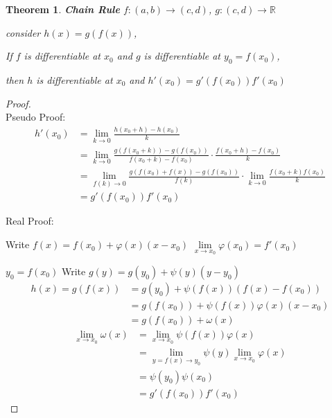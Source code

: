 \documentclass[12pt]{article}
\theoremstyle{plain}
\newtheorem{theorem}{Theorem}[subsection]
\renewcommand{\phi}{\varphi}
\newcommand{\dlim}{\displaystyle\lim\limits}
\begin{document}
    \begin{theorem}{\textbf{Chain Rule}}
        $f:(a,b) \to (c,d)$, $g:(c, d) \to \mathbb{R}$

        consider $h(x) = g(f(x))$,

        If $f$ is differentiable at $x_0$ and $g$ is differentiable
        at $y_0 =f (x_0)$,

        then $h$ is differentiable at $x_0$ and $h'(x_0)= g'(f(x_0))f'(x_0)$ 
    \end{theorem}
    \begin{proof}
    	$ $\\
        Pseudo Proof: 
        \begin{align*}
            h'(x_0) &= \dlim_{k \to 0} \frac{h(x_0+h)-h(x_0)}{k}\\
            &=\dlim_{k \to 0} \frac{g(f(x_0+k))-g(f(x_0))}{f(x_0+k)-f(x_0)}
            \cdot\frac{f(x_0+h)-f(x_0)}k\\ 
            &=\dlim_{f(k)\to 0} \frac{g(f(x_0)+f(x))-g(f(x_0))}{f(k)}\cdot 
            \dlim_{k\to 0} \frac{f(x_0+k) f(x_0)}k \\
            &=g'(f(x_0))f'(x_0)
        \end{align*}

				Real Proof: 

        Write $f(x) = f(x_0) +\phi(x) (x-x_0)$
        $\dlim_{x\to x_0} \phi(x_0) = f'(x_0)$

        $y_0 =f(x_0)$ Write $g(y) = g(y_0) + \psi (y)(y-y_0)$
        \begin{align*}
            h(x) = g(f(x)) &= g(y_0) +\psi (f(x)) (f(x) - f(x_0))\\
            &=g(f(x_0)) +\psi (f(x)) \phi(x)(x-x_0)\\
            &=g(f(x_0))+\omega(x)
        \end{align*}
        \begin{align*}
            \dlim_{x\to x_0} \omega(x) &=\dlim_{x\to x_0} \psi(f(x)) \phi(x)\\
            &=\dlim_{y=f(x)\to y_0} \psi(y) \dlim_{x\to x_0} \phi(x)\\
            &=\psi(y_0) \psi(x_0)\\
            &=g'(f(x_0)) f'(x_0)
        \end{align*}
    \end{proof}
\end{document}
